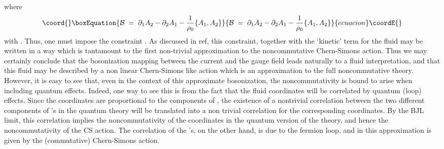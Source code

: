 \documentclass[a4paper,12pt]{article}
\begin{document}
where
\begin{equation}\coord{}\boxEquation{
  \label{eq:defcb}
{\mathcal B} \;=\; \partial_1 A_2 - \partial_2 A_1 -
\frac{1}{\rho_0} \{ A_1 , A_2 \} 
}{
  {\mathcal B} \;=\; \partial_1 A_2 - \partial_2 A_1 -
\frac{1}{\rho_0} \{ A_1 , A_2 \} 
}{ecuacion}\coordE{}\end{equation}
with \coordHE{}. Thus, one
must impose the constraint
\coordHE{}.  As discussed in ref\cite{susskind}, this
constraint, together with the `kinetic' term for the fluid may be
written in a way which is tantamount to the first non-trivial
approximation to the noncommutative Chern-Simons action. Thus we
may
certainly conclude that the bosonization mapping between the
current
and the gauge field leads naturally to a fluid interpretation, and
that this fluid may be described by a non linear Chern-Simons like
action which is an approximation to the full noncommutative theory.
However, it is easy to see that, even in the context of this
approximate bosonization, the noncommutativity is bound to arise
when
including quantum effects.  Indeed, one way to see this is from the
fact that the fluid coordinates \coordHE{} will be correlated by quantum
(loop) effects.  Since the coordinates are proportional to the
components of \coordHE{}, the existence of a nontrivial correlation
between
the two different components of \coordHE{}'s in the quantum theory will be
translated into a non trivial correlation for the corresponding
coordinates.  By the BJL limit, this correlation implies the
noncommutativity of the coordinates in the quantum version of the
theory, and hence the noncommutativity of the CS action.  The
correlation of the \coordHE{}'s, on the other hand, is due to the fermion
loop, and in this approximation is given by the (commutative)
Chern-Simons action.
\end{document}
